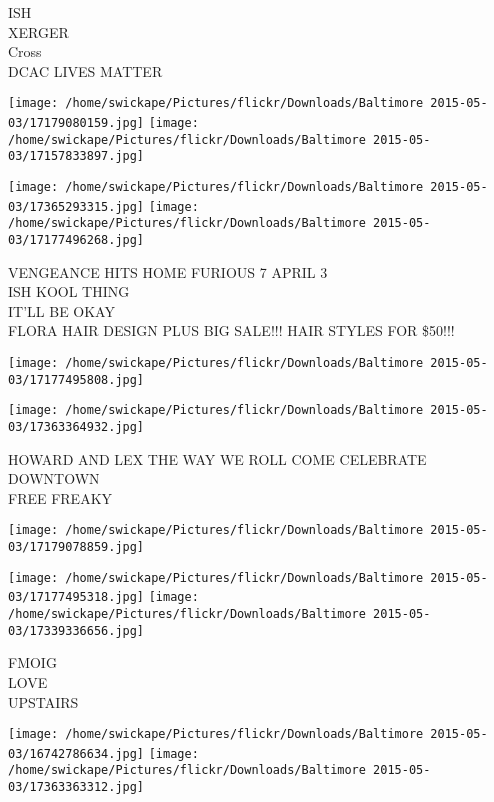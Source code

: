 \documentclass[10pt,letterpaper]{article}
\begin{document}
ISH\\
XERGER\\
Cross\\
DCAC LIVES MATTER\\
\pagebreak

\texttt{[image: /home/swickape/Pictures/flickr/Downloads/Baltimore 2015-05-03/17179080159.jpg]}
\texttt{[image: /home/swickape/Pictures/flickr/Downloads/Baltimore 2015-05-03/17157833897.jpg]}

\texttt{[image: /home/swickape/Pictures/flickr/Downloads/Baltimore 2015-05-03/17365293315.jpg]}
\texttt{[image: /home/swickape/Pictures/flickr/Downloads/Baltimore 2015-05-03/17177496268.jpg]}

VENGEANCE HITS HOME FURIOUS 7 APRIL 3\\
ISH KOOL THING\\
IT'LL BE OKAY\\
FLORA HAIR DESIGN PLUS BIG SALE!!!  HAIR STYLES FOR \$50!!!\\
\pagebreak

\texttt{[image: /home/swickape/Pictures/flickr/Downloads/Baltimore 2015-05-03/17177495808.jpg]}

\vspace{0.25in}
\texttt{[image: /home/swickape/Pictures/flickr/Downloads/Baltimore 2015-05-03/17363364932.jpg]}

HOWARD AND LEX THE WAY WE ROLL COME CELEBRATE DOWNTOWN\\
FREE FREAKY\\
\pagebreak

\texttt{[image: /home/swickape/Pictures/flickr/Downloads/Baltimore 2015-05-03/17179078859.jpg]}

\vspace{0.25in}
\texttt{[image: /home/swickape/Pictures/flickr/Downloads/Baltimore 2015-05-03/17177495318.jpg]}
\texttt{[image: /home/swickape/Pictures/flickr/Downloads/Baltimore 2015-05-03/17339336656.jpg]}

FMOIG\\
LOVE\\
UPSTAIRS\\
\pagebreak

\texttt{[image: /home/swickape/Pictures/flickr/Downloads/Baltimore 2015-05-03/16742786634.jpg]}
\texttt{[image: /home/swickape/Pictures/flickr/Downloads/Baltimore 2015-05-03/17363363312.jpg]}
\end{document}
